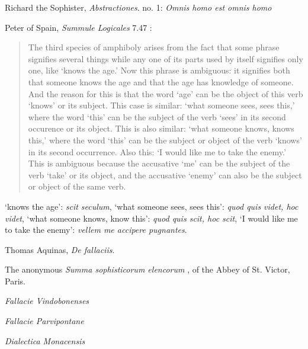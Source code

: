 \documentclass{article}
\begin{document}
Richard the Sophister, {\em Abstractiones}. no. 1: {\em Omnis homo est omnis homo}










Peter of Spain, {\em Summule Logicales} 7.47 \cite[p.~287]{copenhaver}:

\begin{quote}
The third species of amphiboly arises from the fact that some phrase signifies several
things while any one of its parts used by itself signifies only one, like `knows the age.'
Now this phrase is ambiguous: it signifies both that someone knows the age and
that the age has knowledge of someone. And the reason for this is that the word `age'
can be the object of this verb `knows' or its subject. This case is similar: `what someone
sees, sees this,' where the word `this' can be the subject of the verb `sees' in its second
occurence or its object. This is also similar: `what someone knows, knows this,'
where the word `this' can be the subject or object of the verb `knows' in its second
occurrence. Also this: `I would like me to take the enemy.' This is ambiguous because
the accusative `me' can be the subject of the verb `take' or its object, and the accusative
`enemy' can also be the subject or object of the same verb.
\end{quote}

`knows the age': {\em scit seculum}, `what someone sees, sees this': {\em quod quis videt, hoc videt}, 
`what someone knows, know this': {\em quod quis scit, hoc scit},
`I would like me to take the enemy': {\em vellem me accipere pugnantes}.







Thomas Aquinas, {\em De fallaciis}.















The anonymous {\em Summa sophisticorum elencorum}  \cite{modernorum1}, of the Abbey of St. Victor, Paris.

{\em Fallacie Vindobonenses}  \cite{modernorum1}

{\em Fallacie Parvipontane}  \cite{modernorum1}

{\em Dialectica Monacensis} \cite[pp.~565--567]{modernorum22}
\end{document}
